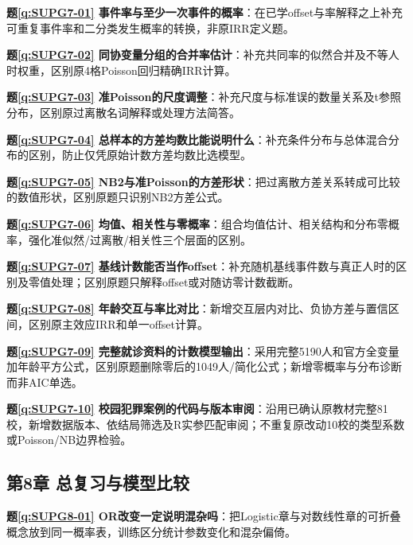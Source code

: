 \noindent\textbf{题\ref*{q:SUPG7-01} 事件率与至少一次事件的概率}：在已学offset与率解释之上补充可重复事件率和二分类发生概率的转换，非原IRR定义题。\par

\noindent\textbf{题\ref*{q:SUPG7-02} 同协变量分组的合并率估计}：补充共同率的似然合并及不等人时权重，区别原4格Poisson回归精确IRR计算。\par

\noindent\textbf{题\ref*{q:SUPG7-03} 准Poisson的尺度调整}：补充尺度与标准误的数量关系及t参照分布，区别原过离散名词解释或处理方法简答。\par

\noindent\textbf{题\ref*{q:SUPG7-04} 总样本的方差均数比能说明什么}：补充条件分布与总体混合分布的区别，防止仅凭原始计数方差均数比选模型。\par

\noindent\textbf{题\ref*{q:SUPG7-05} NB2与准Poisson的方差形状}：把过离散方差关系转成可比较的数值形状，区别原题只识别NB2方差公式。\par

\noindent\textbf{题\ref*{q:SUPG7-06} 均值、相关性与零概率}：组合均值估计、相关结构和分布零概率，强化准似然/过离散/相关性三个层面的区别。\par

\noindent\textbf{题\ref*{q:SUPG7-07} 基线计数能否当作offset}：补充随机基线事件数与真正人时的区别及零值处理；区别原题只解释offset或对随访零计数截断。\par

\noindent\textbf{题\ref*{q:SUPG7-08} 年龄交互与率比对比}：新增交互层内对比、负协方差与置信区间，区别原主效应IRR和单一offset计算。\par

\noindent\textbf{题\ref*{q:SUPG7-09} 完整就诊资料的计数模型输出}：采用完整5190人和官方全变量加年龄平方公式，区别原题删除零后的1049人/简化公式；新增零概率与分布诊断而非AIC单选。\par

\noindent\textbf{题\ref*{q:SUPG7-10} 校园犯罪案例的代码与版本审阅}：沿用已确认原教材完整81校，新增数据版本、依结局筛选及R实参匹配审阅；不重复原改动10校的类型系数或Poisson/NB边界检验。\par

\subsection*{第8章 总复习与模型比较}

\noindent\textbf{题\ref*{q:SUPG8-01} OR改变一定说明混杂吗}：把Logistic章与对数线性章的可折叠概念放到同一概率表，训练区分统计参数变化和混杂偏倚。\par


